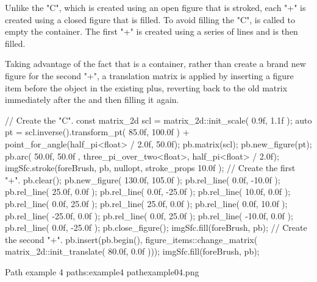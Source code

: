 \pnum
Unlike the "C", which is created using an open figure that is stroked, each "+" is created using a closed figure that is filled. To avoid filling the "C",  is called to empty the container. The first "+" is created using a series of lines and is then filled.

\pnum
Taking advantage of the fact that  is a container, rather than create a brand new figure for the second "+", a translation matrix is applied by inserting a  figure item before the  object in the existing plus, reverting back to the old matrix immediately after the  and then filling it again.

\begin{codeblock}
// Create the "C".
const matrix_2d scl = matrix_2d::init_scale({ 0.9f, 1.1f });
auto pt = scl.inverse().transform_pt({ 85.0f, 100.0f }) +
  point_for_angle(half_pi<float> / 2.0f, 50.0f);
pb.matrix(scl);
pb.new_figure(pt);
pb.arc({ 50.0f, 50.0f }, three_pi_over_two<float>, half_pi<float> / 2.0f);
imgSfc.stroke(foreBrush, pb, nullopt, stroke_props{ 10.0f });
// Create the first "+".
pb.clear();
pb.new_figure({ 130.0f, 105.0f });
pb.rel_line({ 0.0f, -10.0f });
pb.rel_line({ 25.0f, 0.0f });
pb.rel_line({ 0.0f, -25.0f });
pb.rel_line({ 10.0f, 0.0f });
pb.rel_line({ 0.0f, 25.0f });
pb.rel_line({ 25.0f, 0.0f });
pb.rel_line({ 0.0f, 10.0f });
pb.rel_line({ -25.0f, 0.0f });
pb.rel_line({ 0.0f, 25.0f });
pb.rel_line({ -10.0f, 0.0f });
pb.rel_line({ 0.0f, -25.0f });
pb.close_figure();
imgSfc.fill(foreBrush, pb);
// Create the second "+".
pb.insert(pb.begin(), figure_items::change_matrix(
  matrix_2d::init_translate({ 80.0f, 0.0f })));
imgSfc.fill(foreBrush, pb);
\end{codeblock}

\begin{importgraphiciotwod}
{Path example 4}
{paths:example4}
{pathexample04.png}
\end{importgraphiciotwod}

\FloatBarrier
%
%
%
%
%
%
